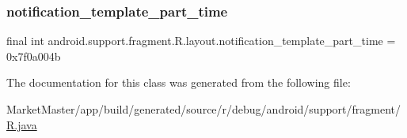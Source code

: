 \subsubsection{\texorpdfstring{notification\+\_\+template\+\_\+part\+\_\+time}{notification\_template\_part\_time}}
{\footnotesize\ttfamily final int android.\+support.\+fragment.\+R.\+layout.\+notification\+\_\+template\+\_\+part\+\_\+time = 0x7f0a004b\hspace{0.3cm}{\ttfamily [static]}}



The documentation for this class was generated from the following file\+:\begin{DoxyCompactItemize}
\item 
Market\+Master/app/build/generated/source/r/debug/android/support/fragment/\mbox{\hyperlink{debug_2android_2support_2fragment_2R_8java}{R.\+java}}\end{DoxyCompactItemize}
